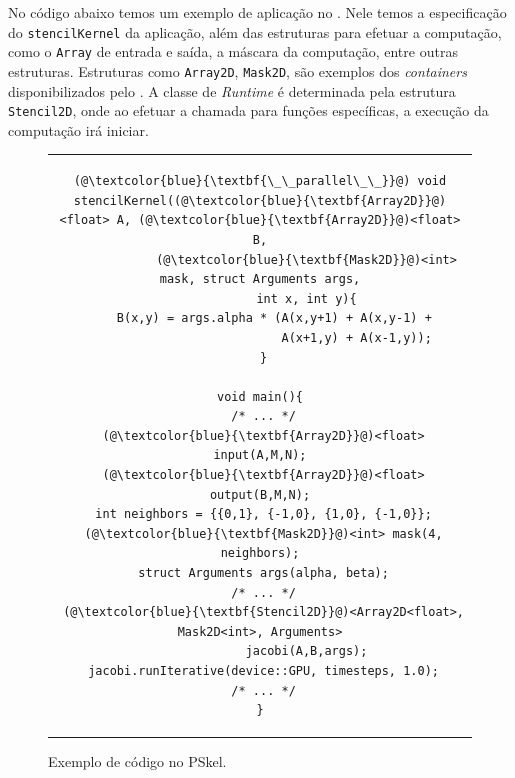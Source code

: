 No código abaixo temos um exemplo de aplicação no \fw. Nele temos a
especificação do \texttt{stencilKernel} da aplicação, além das estruturas para
efetuar a computação, como o \texttt{Array} de entrada e saída, a máscara da
computação, entre outras estruturas. Estruturas como \texttt{Array2D},
\texttt{Mask2D}, são exemplos dos \textit{containers} disponibilizados pelo \fw.
A classe de \textit{Runtime} é determinada pela estrutura \texttt{Stencil2D},
onde ao efetuar a chamada para funções específicas, a execução da computação irá
iniciar.

\renewcommand{\lstlistingname}{Código}


\begin{figure}[thp] %
\centering          %
\caption*{Exemplo de código no PSkel.}
\begin{tabular}{c}

\begin{lstlisting}[]
(@\textcolor{blue}{\textbf{\_\_parallel\_\_}}@) void
stencilKernel((@\textcolor{blue}{\textbf{Array2D}}@)<float> A, (@\textcolor{blue}{\textbf{Array2D}}@)<float> B,
             (@\textcolor{blue}{\textbf{Mask2D}}@)<int> mask, struct Arguments args,
             int x, int y){
    B(x,y) = args.alpha * (A(x,y+1) + A(x,y-1) +
                           A(x+1,y) + A(x-1,y));
 }

void main(){
 /* ... */
 (@\textcolor{blue}{\textbf{Array2D}}@)<float> input(A,M,N);
 (@\textcolor{blue}{\textbf{Array2D}}@)<float> output(B,M,N);
 int neighbors = {{0,1}, {-1,0}, {1,0}, {-1,0}};
 (@\textcolor{blue}{\textbf{Mask2D}}@)<int> mask(4, neighbors);
 struct Arguments args(alpha, beta);
 /* ... */
 (@\textcolor{blue}{\textbf{Stencil2D}}@)<Array2D<float>, Mask2D<int>, Arguments>
             jacobi(A,B,args);
 jacobi.runIterative(device::GPU, timesteps, 1.0);
 /* ... */
}
\end{lstlisting}
\end{tabular}
\end{figure}


